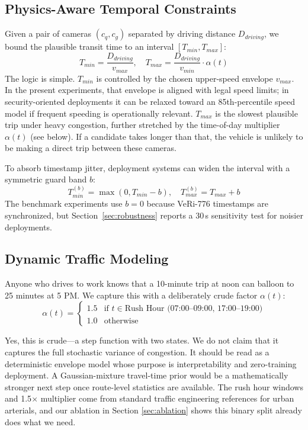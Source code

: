 \documentclass{ijitcs}
\newcommand{\rev}[1]{#1}
\begin{document}
\subsection{Physics-Aware Temporal Constraints}
Given a pair of cameras $(c_q, c_g)$ separated by driving distance $D_{driving}$, we bound the plausible transit time to an interval $[T_{min}, T_{max}]$:
\begin{equation}
    T_{min} = \frac{D_{driving}}{v_{max}}, \quad T_{max} = \frac{D_{driving}}{v_{min}} \cdot \alpha(t)
\label{eq:time_bounds}
\end{equation}
The logic is simple. \rev{$T_{min}$ is controlled by the chosen upper-speed envelope $v_{max}$. In the present experiments, that envelope is aligned with legal speed limits; in security-oriented deployments it can be relaxed toward an 85th-percentile speed model if frequent speeding is operationally relevant. $T_{max}$ is the slowest plausible trip under heavy congestion, further stretched by the time-of-day multiplier $\alpha(t)$ (see below). If a candidate takes longer than that, the vehicle is unlikely to be making a direct trip between these cameras.}

\rev{To absorb timestamp jitter, deployment systems can widen the interval with a symmetric guard band $b$:}
\begin{equation}
    \rev{T_{min}^{(b)} = \max\left(0, T_{min} - b\right), \quad T_{max}^{(b)} = T_{max} + b}
\label{eq:guard_band}
\end{equation}
\rev{The benchmark experiments use $b=0$ because VeRi-776 timestamps are synchronized, but Section~\ref{sec:robustness} reports a 30\,s sensitivity test for noisier deployments.}

\subsection{Dynamic Traffic Modeling}
\label{sec:traffic}
Anyone who drives to work knows that a 10-minute trip at noon can balloon to 25 minutes at 5 PM. We capture this with a deliberately crude factor $\alpha(t)$:
\begin{equation}
    \alpha(t) = \begin{cases}
        1.5 & \text{if } t \in \text{Rush Hour (07:00--09:00, 17:00--19:00)} \\
        1.0 & \text{otherwise}
    \end{cases}
\label{eq:alpha}
\end{equation}

\rev{Yes, this is crude---a step function with two states. We do not claim that it captures the full stochastic variance of congestion. It should be read as a deterministic envelope model whose purpose is interpretability and zero-training deployment. A Gaussian-mixture travel-time prior would be a mathematically stronger next step once route-level statistics are available.} The rush hour windows and 1.5$\times$ multiplier come from standard traffic engineering references for urban arterials, and our ablation in Section \ref{sec:ablation} shows this binary split already does what we need.
\end{document}
